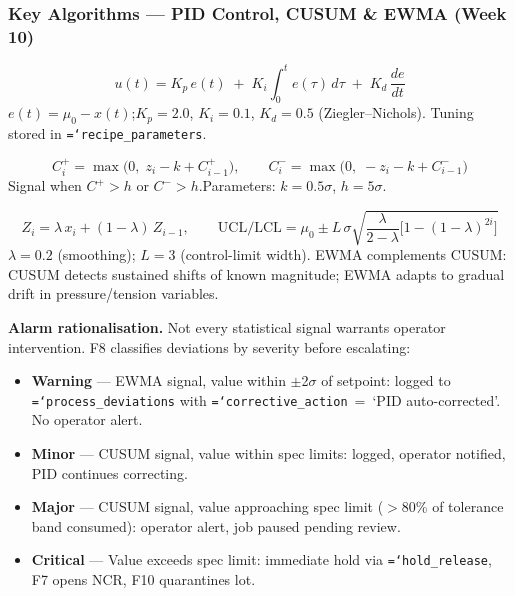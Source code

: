 \documentclass[11pt]{article}
\newcommand{\tfield}[1]{\texttt{\hyphenchar\font=`\-\relax #1}}
\begin{document}
\subsubsection*{Key Algorithms --- PID Control, CUSUM \& EWMA (Week 10)}

\begin{eqbox}
\[
u(t) = K_p\, e(t) \;+\; K_i \!\int_0^t e(\tau)\,d\tau \;+\; K_d\, \frac{de}{dt}
\]
$e(t) = \mu_0 - x(t)$;\quad $K_p = 2.0$, $K_i = 0.1$, $K_d = 0.5$ (Ziegler--Nichols).  Tuning stored in \tfield{recipe\_parameters}.
\end{eqbox}

\begin{eqbox}
\[
C_i^{+} = \max\!\bigl(0,\; z_i - k + C_{i-1}^{+}\bigr), \qquad C_i^{-} = \max\!\bigl(0,\; -z_i - k + C_{i-1}^{-}\bigr)
\]
Signal when $C^{+} > h$ or $C^{-} > h$.\quad Parameters: $k = 0.5\sigma$, $h = 5\sigma$.
\end{eqbox}

\begin{eqbox}
\[
Z_i = \lambda\, x_i + (1 - \lambda)\, Z_{i-1}, \qquad \text{UCL/LCL} = \mu_0 \pm L\,\sigma\sqrt{\frac{\lambda}{2 - \lambda}\bigl[1 - (1-\lambda)^{2i}\bigr]}
\]
$\lambda = 0.2$ (smoothing);\; $L = 3$ (control-limit width).  EWMA complements CUSUM: CUSUM detects sustained shifts of known magnitude; EWMA adapts to gradual drift in pressure/tension variables.
\end{eqbox}

\textbf{Alarm rationalisation.}  Not every statistical signal warrants operator intervention.  F8 classifies deviations by severity before escalating:
\begin{itemize}[leftmargin=1.8em, itemsep=1pt]
\item \textbf{Warning} --- EWMA signal, value within $\pm$2$\sigma$ of setpoint: logged to \tfield{process\_deviations} with \tfield{corrective\_action}~=~`PID auto-corrected'.  No operator alert.
\item \textbf{Minor} --- CUSUM signal, value within spec limits: logged, operator notified, PID continues correcting.
\item \textbf{Major} --- CUSUM signal, value approaching spec limit ($>$80\% of tolerance band consumed): operator alert, job paused pending review.
\item \textbf{Critical} --- Value exceeds spec limit: immediate hold via \tfield{hold\_release}, F7 opens NCR, F10 quarantines lot.
\end{itemize}
\end{document}
